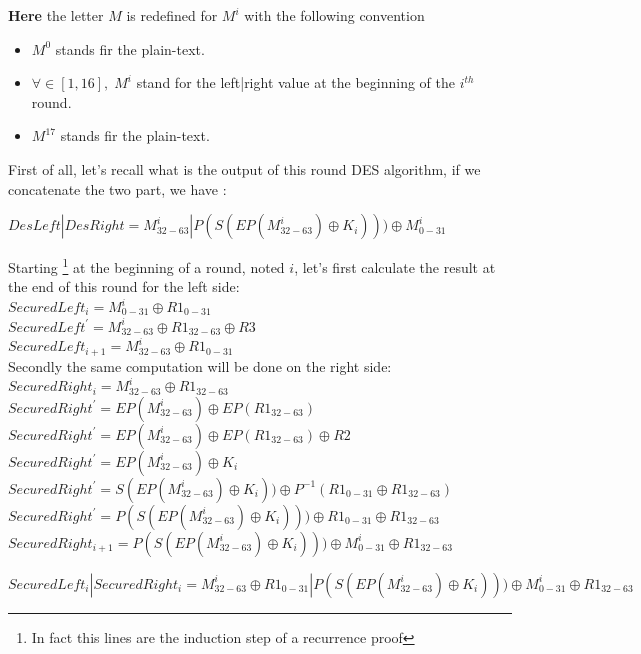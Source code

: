 \textbf{Here} the letter $M$ is redefined for $M^i$ with the following convention
\begin{itemize}
\item $M^0$ stands fir the plain-text.
\item $\forall \in [1,16], \; M^i$ stand for the left|right value at the beginning
of the $i^{th}$ round.
\item $M^{17}$ stands fir the plain-text.
\end{itemize}

First of all, let's recall what is the output of this round DES algorithm, 
if we concatenate the two part, we have :
\begin{center}
$DesLeft | DesRight = M_{32-63}^i  |  P(S(EP(M_{32-63}^i) \oplus K_{i})))\oplus M_{0-31}^i$
\end{center}
Starting \footnote{In fact this lines are the induction step of a recurrence proof}
at the beginning of a round, noted $ i $, let's first calculate the 
result at the end of this round for the left side:\\
$SecuredLeft_i=M_{0-31}^i \oplus R1_{0-31}$ \\
$SecuredLeft^{'} = M_{32-63}^i \oplus R1_{32-63} \oplus R3 $ \\ 
$SecuredLeft_{i+1} = M_{32-63}^i \oplus R1_{0-31} $ \\
Secondly the same computation will be done on the right side:\\
$SecuredRight_i = M_{32-63}^i \oplus R1_{32-63} $ \\ 
$SecuredRight^{'} = EP(M_{32-63}^i) \oplus EP(R1_{32-63}) $ \\ 
$SecuredRight^{'} = EP(M_{32-63}^i) \oplus EP(R1_{32-63}) \oplus R2   $ \\ 
$SecuredRight^{'} = EP(M_{32-63}^i) \oplus K_{i} $ \\ 
$SecuredRight^{'} = 
S(EP(M_{32-63}^i) \oplus K_{i})) \oplus P^{-1}( R1_{0-31}\oplus R1_{32-63}) $ \\ 
$SecuredRight^{'} = 
P(S(EP(M_{32-63}^i) \oplus K_{i}))) \oplus R1_{0-31}\oplus R1_{32-63} $ \\ 
$SecuredRight_{i+1}= 
P(S(EP(M_{32-63}^i) \oplus K_{i})))\oplus M_{0-31}^i \oplus R1_{32-63}$ 
\vspace{5mm}
\begin{center}
$SecuredLeft_i | SecuredRight_i
	= M_{32-63}^i \oplus R1_{0-31} 
	| P(S(EP(M_{32-63}^i) \oplus K_{i})))\oplus M_{0-31}^i \oplus R1_{32-63}	$ \\
\end{center}



